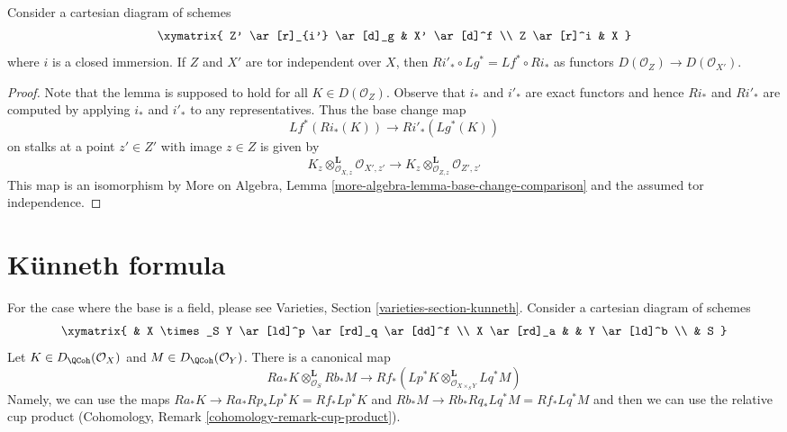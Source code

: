 \begin{lemma}
\label{lemma-compare-base-change-closed-immersion}
Consider a cartesian diagram of schemes
$$
\xymatrix{
Z' \ar[r]_{i'} \ar[d]_g & X' \ar[d]^f \\
Z \ar[r]^i & X
}
$$
where $i$ is a closed immersion. If $Z$ and $X'$ are
tor independent over $X$, then $Ri'_* \circ Lg^* = Lf^* \circ Ri_*$
as functors $D(\mathcal{O}_Z) \to D(\mathcal{O}_{X'})$.
\end{lemma}

\begin{proof}
Note that the lemma is supposed to hold for all $K \in D(\mathcal{O}_Z)$.
Observe that $i_*$ and $i'_*$ are exact functors and hence
$Ri_*$ and $Ri'_*$ are computed by applying $i_*$ and $i'_*$
to any representatives. Thus the base change map
$$
Lf^*(Ri_*(K)) \longrightarrow Ri'_*(Lg^*(K))
$$
on stalks at a point $z' \in Z'$ with image $z \in Z$ is given by
$$
K_z \otimes_{\mathcal{O}_{X, z}}^\mathbf{L} \mathcal{O}_{X', z'}
\longrightarrow
K_z \otimes_{\mathcal{O}_{Z, z}}^\mathbf{L} \mathcal{O}_{Z', z'}
$$
This map is an isomorphism by
More on Algebra, Lemma \ref{more-algebra-lemma-base-change-comparison}
and the assumed tor independence.
\end{proof}








\section{K\"unneth formula}
\label{section-kunneth}

\noindent
For the case where the base is a field, please see
Varieties, Section \ref{varieties-section-kunneth}.
Consider a cartesian diagram of schemes
$$
\xymatrix{
& X \times_S Y \ar[ld]^p \ar[rd]_q \ar[dd]^f \\
X \ar[rd]_a & & Y \ar[ld]^b \\
& S
}
$$
Let $K \in D_\QCoh(\mathcal{O}_X)$ and $M \in D_\QCoh(\mathcal{O}_Y)$.
There is a canonical map
\begin{equation}
\label{equation-kunneth}
Ra_*K \otimes_{\mathcal{O}_S}^\mathbf{L} Rb_*M
\longrightarrow
Rf_*(Lp^*K \otimes_{\mathcal{O}_{X \times_S Y}}^\mathbf{L} Lq^*M)
\end{equation}
Namely, we can use the maps
$Ra_*K \to Ra_*Rp_* Lp^*K = Rf_*Lp^*K$ and
$Rb_*M \to Rb_*Rq_* Lq^*M = Rf_*Lq^*M$ and then we can use the
relative cup product (Cohomology, Remark \ref{cohomology-remark-cup-product}).

